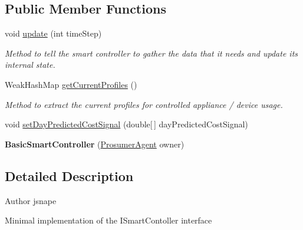 \subsection*{Public Member Functions}
\begin{DoxyCompactItemize}
\item 
void \hyperlink{classuk_1_1ac_1_1dmu_1_1iesd_1_1cascade_1_1controllers_1_1_basic_smart_controller_a0220e86b744e9e30d6ccc36130acf474}{update} (int time\-Step)
\begin{DoxyCompactList}\small\item\em Method to tell the smart controller to gather the data that it needs and update its internal state. \end{DoxyCompactList}\item 
Weak\-Hash\-Map \hyperlink{classuk_1_1ac_1_1dmu_1_1iesd_1_1cascade_1_1controllers_1_1_basic_smart_controller_abf5f0fb95e658558c8cd396ab9dfa10b}{get\-Current\-Profiles} ()
\begin{DoxyCompactList}\small\item\em Method to extract the current profiles for controlled appliance / device usage. \end{DoxyCompactList}\item 
void \hyperlink{classuk_1_1ac_1_1dmu_1_1iesd_1_1cascade_1_1controllers_1_1_basic_smart_controller_ab326fc6e3ef172ad74fa4f81c6991060}{set\-Day\-Predicted\-Cost\-Signal} (double\mbox{[}$\,$\mbox{]} day\-Predicted\-Cost\-Signal)
\item 
\hypertarget{classuk_1_1ac_1_1dmu_1_1iesd_1_1cascade_1_1controllers_1_1_basic_smart_controller_a3566034b17dbf7e36c223d42730747de}{{\bfseries Basic\-Smart\-Controller} (\hyperlink{classuk_1_1ac_1_1dmu_1_1iesd_1_1cascade_1_1agents_1_1prosumers_1_1_prosumer_agent}{Prosumer\-Agent} owner)}\label{classuk_1_1ac_1_1dmu_1_1iesd_1_1cascade_1_1controllers_1_1_basic_smart_controller_a3566034b17dbf7e36c223d42730747de}

\end{DoxyCompactItemize}


\subsection{Detailed Description}
\begin{DoxyAuthor}{Author}
jsnape
\end{DoxyAuthor}
Minimal implementation of the I\-Smart\-Contoller interface 

